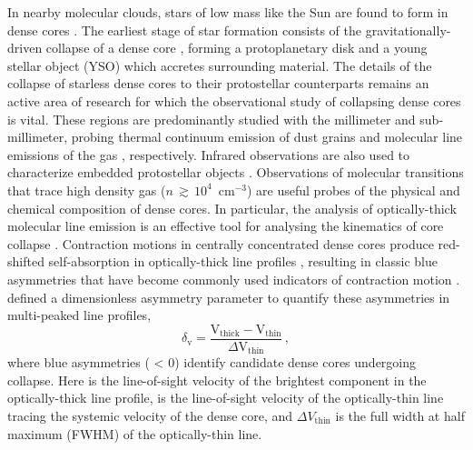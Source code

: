\documentclass[iop,twocolappendix]{emulateapj}
\begin{document}
In nearby molecular clouds, stars of low mass like the Sun are found to form in dense cores \citep{Myers1985, Cernicharo1991, Lada1993}. The earliest stage of star formation consists of the gravitationally-driven collapse of a dense core \citep{Larson1969, Shu1977}, forming a protoplanetary disk and a young stellar object (YSO) which accretes surrounding material. The details of the collapse of starless dense cores to their protostellar counterparts remains an active area of research for which the observational study of collapsing dense cores is vital. These regions are predominantly studied with the millimeter and sub-millimeter, probing thermal continuum emission of dust grains \citep[e.g.,][]{Enoch2006} and molecular line emissions of the gas \citep[e.g.,][]{Aikawa2003}, respectively. Infrared observations are also used to characterize embedded protostellar objects \citep[e.g.,][]{Jorgensen2007, Enoch2009, Evans2009}. Observations of molecular transitions that trace high density gas ($n {\,}{\gtrsim}{\,} 10^4$~cm$^{-3}$) are useful probes of the physical and chemical composition of dense cores. In particular, the analysis of optically-thick molecular line emission is an effective tool for analysing the kinematics of core collapse \citep{Myers2000}. Contraction motions in centrally concentrated dense cores produce red-shifted self-absorption in optically-thick line profiles \citep{Leung1977}, resulting in classic blue asymmetries that have become commonly used indicators of contraction motion \citep[see][]{Leung1977, Snell1977, Zhou1992, Mardones1997, Gregersen2000, Myers2000, Lee2011, Chira2014}. \citet{Mardones1997} defined a dimensionless asymmetry parameter to quantify these asymmetries in multi-peaked line profiles, 
%
\begin{equation} 
\label{eq:deltaV}
{\delta}_\mathrm{v} = \frac{ \mathrm{V}_{\mathrm{thick}} - \mathrm{V}_{\mathrm{thin}} }{ {\Delta}\mathrm{V}_{\mathrm{thin}} } \, ,
\end{equation}
%
where blue asymmetries ({\deltaV} {\textless} 0) identify candidate dense cores undergoing collapse. Here {\Vthick} is the line-of-sight velocity of the brightest component in the optically-thick line profile, {\Vthin} is the line-of-sight velocity of the optically-thin line tracing the systemic velocity of the dense core, and ${\Delta}V_\mathrm{thin}$ is the full width at half maximum (FWHM) of the optically-thin line.
\end{document}
